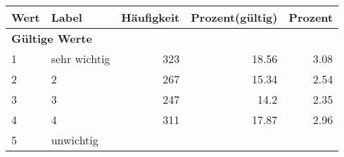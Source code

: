      \begin{longtable}{lXrrr}
     \toprule
     \textbf{Wert} & \textbf{Label} & \textbf{Häufigkeit} & \textbf{Prozent(gültig)} & \textbf{Prozent} \\
     \endhead
     \midrule
     \multicolumn{5}{l}{\textbf{Gültige Werte}}\\

     1 &
     \multicolumn{1}{X}{ sehr wichtig   } &


       \num{323} &
       \num[round-mode=places,round-precision=2]{18.56} &
         \num[round-mode=places,round-precision=2]{3.08} \\

     2 &
     \multicolumn{1}{X}{ 2   } &


       \num{267} &
       \num[round-mode=places,round-precision=2]{15.34} &
         \num[round-mode=places,round-precision=2]{2.54} \\

     3 &
     \multicolumn{1}{X}{ 3   } &


       \num{247} &
       \num[round-mode=places,round-precision=2]{14.2} &
         \num[round-mode=places,round-precision=2]{2.35} \\

     4 &
     \multicolumn{1}{X}{ 4   } &


       \num{311} &
       \num[round-mode=places,round-precision=2]{17.87} &
         \num[round-mode=places,round-precision=2]{2.96} \\

     5 &
     \multicolumn{1}{X}{ unwichtig   } &



\end{longtable}
